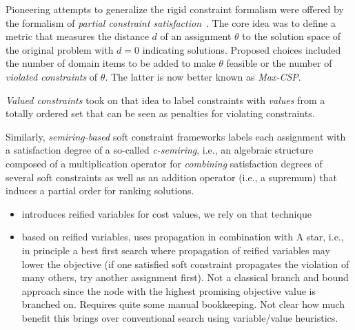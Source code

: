 Pioneering attempts to generalize the rigid constraint formalism
were offered by the formalism of \emph{partial constraint 
satisfaction}~\cite{FreuderW92}. The core idea was to define
a metric that measures the distance $d$ of an assignment $\theta$
to the solution space of the original problem
with $d=0$ indicating solutions. Proposed
choices included the number of domain items to be added to make 
$\theta$ feasible or the number of \emph{violated constraints} of 
$\theta$. The latter is now better known as \emph{Max-CSP}.

\emph{Valued constraints} took on that idea to label constraints
with \emph{values} from a totally ordered set that can be seen as 
penalties for violating constraints.

Similarly, \emph{semiring-based} soft constraint frameworks
labels each assignment with a satisfaction degree of a so-called 
\emph{c-semiring}, i.e., an algebraic structure composed of a 
multiplication operator for \emph{combining} satisfaction degrees of 
several soft constraints as well as an addition operator (i.e., a supremum) that induces a partial order for ranking solutions.

\begin{itemize}
\item {} introduces reified variables for cost values, we rely
on that technique
\item {} based on reified variables, uses propagation in combination with A star, i.e., in principle a best first search where propagation of reified variables may lower the objective (if one satisfied soft constraint propagates the violation of many others, try another assignment first). Not a classical branch and bound approach since
the node with the highest promising objective value is branched on. Requires quite some manual bookkeeping. Not clear how much benefit this brings over conventional search using variable/value heuristics. 
\end{itemize}
